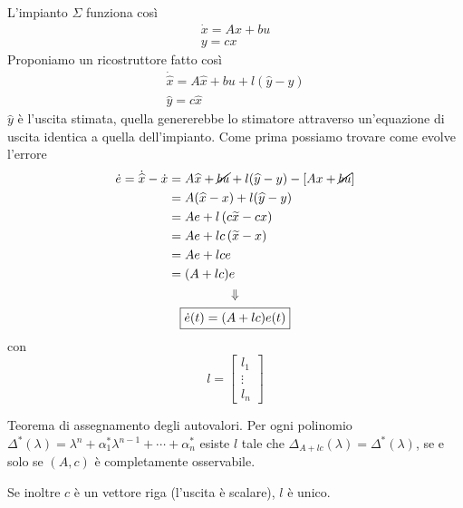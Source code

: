 L'impianto $\Sigma $ funziona così
\begin{gather*}
	\dot{x} =Ax+bu\\
	y=cx
\end{gather*}
Proponiamo un ricostruttore fatto così
\begin{gather*}
	\boxed{\dot{\hat{x}} =A\hat{x} +bu+l(\hat{y} -y)}\\
	\hat{y} =c\hat{x}
\end{gather*}
$\hat{y}$ è l'uscita stimata, quella genererebbe lo stimatore attraverso un'equazione di uscita identica a quella dell'impianto. Come prima possiamo trovare come evolve l'errore
\begin{gather*}
	\begin{aligned}
		\dot{e} =\dot{\hat{x}} -\dot{x} & =A\hat{x} +\cancel{bu} +l(\hat{y} -y) -\left[ Ax+\cancel{bu}\right] \\
		                                & =A(\hat{x} -x) +l(\hat{y} -y)                                       \\
		                                & =Ae+l\left(c\tilde{x} -cx\right)                                    \\
		                                & =Ae+lc\left(\tilde{x} -x\right)                                     \\
		                                & =Ae+lce                                                             \\
		                                & =(A+lc) e                                                           
	\end{aligned}\\
	\Downarrow \\
	\boxed{\dot{e}(t) =(A+lc) e(t)}
\end{gather*}
con
\begin{equation*}
	l=\begin{bmatrix}
	l_1\\
	\vdots \\
	l_n
	\end{bmatrix}
\end{equation*}
\begin{thm}
	Teorema di assegnamento degli autovalori. Per ogni polinomio $\Delta ^{*}(\lambda) =\lambda ^n +\alpha ^{*}_1 \lambda ^{n-1} +\cdots +\alpha ^{*}_n$ esiste $l$ tale che $\Delta _{A+lc}(\lambda) =\Delta ^{*}(\lambda)$, se e solo se $(A,c)$ è completamente osservabile.
\end{thm}

Se inoltre $c$ è un vettore riga (l'uscita è scalare), $l$ è unico.

